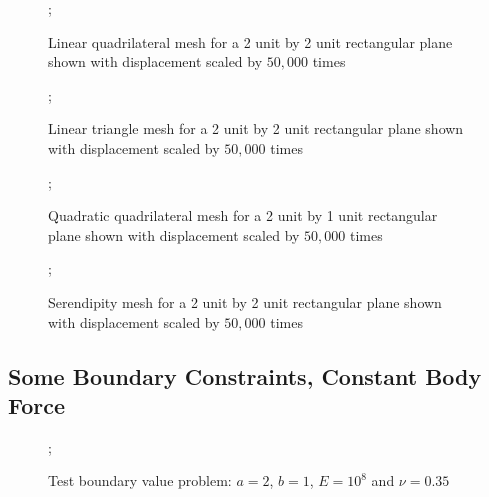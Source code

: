 \documentclass{article}
\begin{document}
\begin{figure}
    ;
    \caption{Linear quadrilateral mesh for a 2 unit by 2 unit rectangular plane shown with displacement scaled by $50,000$ times}
\centering
\end{figure}

\begin{figure}
    ;
    \caption{Linear triangle mesh for a 2 unit by 2 unit rectangular plane shown with displacement scaled by $50,000$ times}
\centering
\end{figure}

\begin{figure}
    ;
    \caption{Quadratic quadrilateral mesh for a 2 unit by 1 unit rectangular plane shown with displacement scaled by $50,000$ times}
\centering
\end{figure}


\begin{figure}
    ;
    \caption{Serendipity mesh for a 2 unit by 2 unit rectangular plane shown with displacement scaled by $50,000$ times}
\centering
\end{figure}

\FloatBarrier
\subsection{Some Boundary Constraints, Constant Body Force}
\FloatBarrier

\begin{figure}
    ;
    \caption{Test boundary value problem: $a = 2$, $b = 1$, $E = 10^8$ and $\nu = 0.35$}
\centering
\end{figure}
\end{document}
